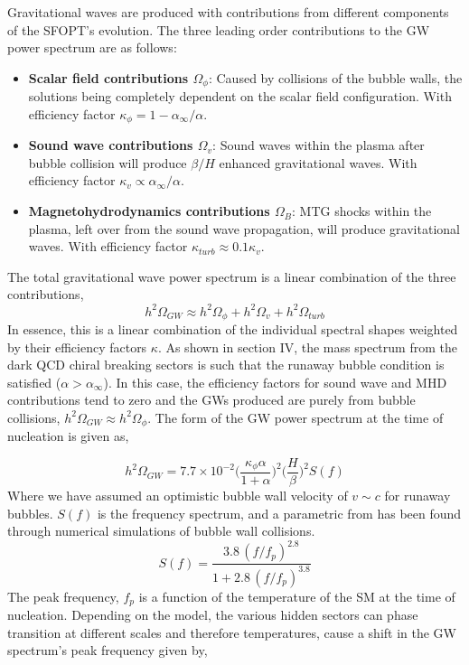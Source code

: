 \documentclass[nofootinbib,twocolumn,preprintnumbers]{revtex4-1}
\begin{document}
Gravitational waves are produced with contributions from different components of the SFOPT's evolution.  The three leading order contributions to the GW power spectrum are as follows:
\begin{itemize}
\item \textbf{Scalar field contributions $\Omega_{\phi}$}: Caused by collisions of the bubble walls, the solutions being completely dependent on the scalar field configuration. With efficiency factor $\kappa_{\phi} = 1 - \alpha_{\infty}/\alpha$.
\item \textbf{Sound wave contributions $\Omega_{v}$}: Sound waves within the plasma after bubble collision will produce $\beta/H$  enhanced gravitational waves. With efficiency factor $\kappa_{v} \propto \alpha_{\infty}/\alpha$.
\item \textbf{Magnetohydrodynamics contributions $\Omega_{B}$}: MTG shocks within the plasma, left over from the sound wave propagation, will produce gravitational waves. With efficiency factor $\kappa_{
turb} \approx 0.1 \kappa_{v} $.
\end{itemize}
The total gravitational wave power spectrum  is a linear combination of the three contributions,
\begin{equation}
h^2\Omega_{GW} \approx h^2\Omega_{\phi} + h^2\Omega_{v} + h^2\Omega_{turb} 
\end{equation}
In essence, this is a linear combination of the individual spectral shapes weighted by their efficiency factors $\kappa$. As shown in section IV, the mass spectrum from the dark QCD chiral breaking sectors is such that the runaway bubble condition is satisfied ($\alpha >\alpha_{\infty}$). In this case, the efficiency factors for sound wave and MHD contributions tend to zero and the GWs produced are purely from bubble collisions, $h^2\Omega_{GW} \approx h^2\Omega_{\phi}$.  The form of the GW power spectrum at the time of nucleation is given as,

\begin{equation}
h^2\Omega_{GW} = 7.7\times 10^{-2} \bigg( \frac{\kappa_{\phi} \alpha}{1 + \alpha} \bigg)^2 \bigg( \frac{H}{\beta} \bigg)^2  S(f)
\end{equation}
Where we have assumed an optimistic bubble wall velocity of $v \sim c$ for runaway bubbles. $S(f)$ is the  frequency spectrum, and a parametric from has been found through numerical simulations of bubble wall collisions.
\begin{equation}
S(f) = \frac{3.8 \,(f/f_p)^{2.8}}{1 + 2.8\,(f/f_p)^{3.8}}
\end{equation}
The peak frequency, $f_{p}$ is a function of the temperature of the SM at the time of nucleation. Depending on the model, the various hidden sectors can phase transition at different scales and therefore temperatures, cause a shift in the GW spectrum's peak frequency given by,
\end{document}

